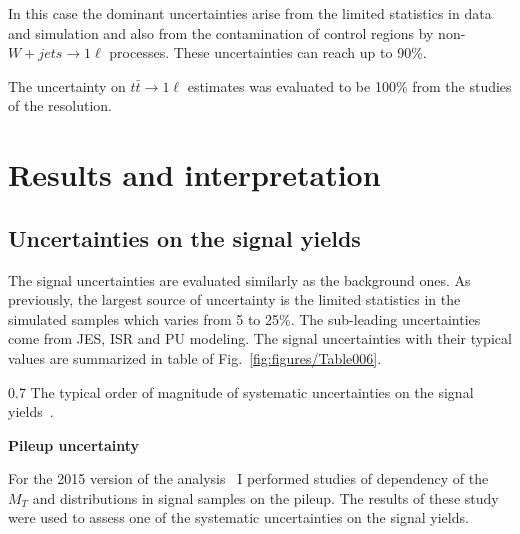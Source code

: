 In this case the dominant uncertainties arise from the limited statistics in data and simulation and also from the contamination of control regions by non-$W+jets \to 1\ell$  processes. These uncertainties can reach up to 90\%.

The uncertainty on $t\bar{t} \to 1\ell$ estimates was evaluated to be 100\% from the studies of the \MET resolution.


\newpage

\section{Results and interpretation~\label{sec:results}}

\subsection{Uncertainties on the signal yields}

The signal uncertainties are evaluated similarly as the background ones.  As previously, the largest source of uncertainty is the limited statistics in the simulated samples which varies from 5 to 25\%. The sub-leading uncertainties come from JES, ISR and PU modeling. The signal uncertainties with their typical values are summarized in table of Fig.~\ref{fig:figures/Table006}.

                 {0.7}       %
                 { The typical order of magnitude of systematic uncertainties on the signal yields~\cite{Sirunyan:2017xse}. }

\textbf{Pileup uncertainty}

For the 2015 version of the analysis~\cite{Sirunyan:2016jpr} I performed studies of dependency of the $M_{T}$ and \MET distributions in signal samples on the pileup. The results of these study were used to assess one of the systematic uncertainties on the signal yields.

